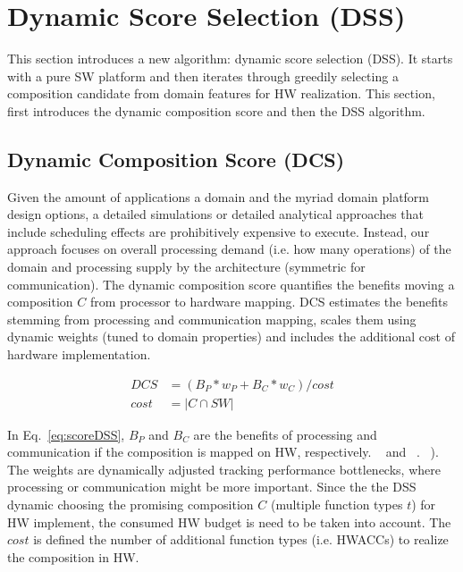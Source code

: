 \section{Dynamic Score Selection (DSS)}
\label{sec:DSS}

This section introduces a new algorithm: dynamic score selection (DSS). It starts with a pure SW platform and then iterates through greedily selecting a composition candidate from domain features for HW realization.  This section, first introduces the dynamic composition score and then the DSS algorithm.


\subsection{Dynamic Composition Score (DCS)}
\label{sub:dcs}

Given the amount of applications a domain and the myriad domain platform design options, a detailed simulations or detailed analytical approaches that include scheduling effects are prohibitively expensive to execute. Instead, our approach focuses on overall processing demand (i.e. how many operations) of the domain and processing supply by the architecture (symmetric for communication). The dynamic composition score quantifies the benefits moving a composition $C$ from processor to hardware mapping. DCS estimates the benefits stemming from processing and communication mapping, scales them using dynamic weights (tuned to domain properties) and includes the additional cost of hardware implementation. 

\begingroup\makeatletter{}\check@mathfonts
\begin{equation}
\begin{split}
\label{eq:scoreDSS}
	DCS &= ( B_{P} * w_{P} + B_{C} * w_{C} ) / cost\\
	cost &= \left\vert{C \cap SW}\right\vert
\end{split}
\end{equation}
\endgroup

In Eq.~\eqref{eq:scoreDSS}, $B_P$ and $B_C$ are the benefits of processing and communication if the composition is mapped on HW, respectively. ~ and ~. ~). The weights are dynamically adjusted tracking performance bottlenecks, where processing or communication might be more important. Since the the DSS dynamic choosing the promising composition $C$ (multiple function types $t$) for HW implement, the consumed HW budget is need to be taken into account. The $cost$ is defined the number of additional function types (i.e. HWACCs) to realize the composition in HW. 



